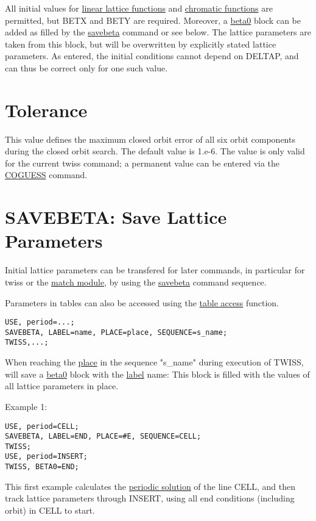 All initial values for \href{../Introduction/tables.html#linear}{linear
  lattice functions} and
\href{../Introduction/tables.html#chrom}{chromatic functions} are
permitted, but BETX and BETY are required. Moreover, a
\href{beta0}{beta0} block can be added as filled by the
\href{../control/general.html#savebeta}{savebeta} command or see
below. The lattice parameters are taken from this block, but will be
overwritten by explicitly stated lattice parameters. As entered, the
initial conditions cannot depend on DELTAP, and can thus be correct only
for one such value.  

\section{Tolerance}

This value defines the maximum closed orbit error of all six orbit
components during the closed orbit search. The default value is
1.e-6. The value is only valid for the current twiss command; a
permanent value can be entered via the
\href{../control/general.html#coguess}{COGUESS} command.  

\section{SAVEBETA: Save Lattice Parameters}

Initial lattice parameters can be transfered for later commands, in
particular for twiss or the \href{../match/match.html}{match module}, by
using the \href{../control/general.html#savebeta}{savebeta} command
sequence.  

Parameters in tables can also be accessed 
using the \href{../Introduction/expression.html#table}{table access}
function. 
\begin{verbatim}
USE, period=...;
SAVEBETA, LABEL=name, PLACE=place, SEQUENCE=s_name;
TWISS,...;
\end{verbatim}

When reaching the \href{../control/general.html#place}{place} in the
sequence "s\_name" during execution of TWISS, \madx will save a
\hyperlink{beta0}{beta0} block with the
\href{../Introduction/label.html}{label} name: This block is filled with
the values of all lattice parameters in place.  

Example 1: 
\begin{verbatim}
USE, period=CELL;
SAVEBETA, LABEL=END, PLACE=#E, SEQUENCE=CELL;
TWISS;
USE, period=INSERT;
TWISS, BETA0=END;
\end{verbatim}
This first example calculates the \hyperlink{periodic}{periodic
  solution} of the line CELL, and then track lattice parameters through
INSERT, using all end conditions (including orbit) in CELL to start.  

